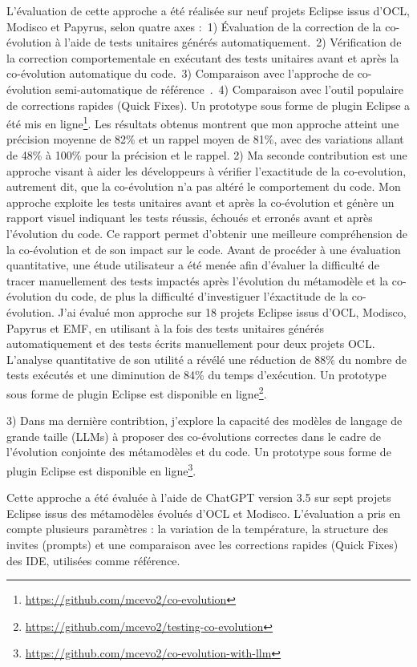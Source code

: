 L'évaluation de cette approche a été réalisée sur neuf projets Eclipse issus d'OCL, Modisco et Papyrus, selon quatre axes :~1) Évaluation de la correction de la co-évolution à l’aide de tests unitaires générés automatiquement.~2) Vérification de la correction comportementale en exécutant des tests unitaires avant et après la co-évolution automatique du code.~3) Comparaison avec l’approche de co-évolution semi-automatique de référence~\cite{Khelladi2020}.~4) Comparaison avec l’outil populaire de corrections rapides (Quick Fixes).
Un prototype sous forme de plugin Eclipse a été mis en ligne\footnote{\url{https://github.com/mcevo2/co-evolution}}. Les résultats obtenus montrent que mon approche atteint une précision moyenne de 82\% et un rappel moyen de 81\%, avec des variations allant de 48\% à 100\% pour la précision et le rappel.
2) Ma seconde contribution est une approche visant à aider les développeurs à vérifier l'exactitude de la co-evolution, autrement dit, que la co-évolution n'a pas altéré le comportement du code. Mon approche exploite les tests unitaires avant et après la co-évolution et génère un rapport visuel indiquant les tests réussis, échoués et erronés avant et après l’évolution du code. Ce rapport permet d’obtenir une meilleure compréhension de la co-évolution et de son impact sur le code.
Avant de procéder à une évaluation quantitative, une étude utilisateur a été menée afin d’évaluer la difficulté de tracer manuellement des tests impactés après l’évolution du métamodèle et la co-évolution du code, de plus la difficulté d'investiguer l'éxactitude de la co-évolution.
J'ai évalué mon approche sur 18 projets Eclipse issus d’OCL, Modisco, Papyrus et EMF, en utilisant à la fois des tests unitaires générés automatiquement et des tests écrits manuellement pour deux projets OCL. L’analyse quantitative de son utilité a révélé une réduction de 88\% du nombre de tests exécutés et une diminution de 84\% du temps d’exécution. Un prototype sous forme de plugin Eclipse est disponible en ligne\footnote{\url{https://github.com/mcevo2/testing-co-evolution}}.



3) Dans ma dernière contribtion, j'explore la capacité des modèles de langage de grande taille (LLMs) à proposer des co-évolutions correctes dans le cadre de l’évolution conjointe des métamodèles et du code. Un prototype sous forme de plugin Eclipse est disponible en ligne\footnote{\url{https://github.com/mcevo2/co-evolution-with-llm}}.

Cette approche a été évaluée à l’aide de ChatGPT version 3.5 sur sept projets Eclipse issus des métamodèles évolués d’OCL et Modisco. L’évaluation a pris en compte plusieurs paramètres : la variation de la température, la structure des invites (prompts) et une comparaison avec les corrections rapides (Quick Fixes) des IDE, utilisées comme référence.

